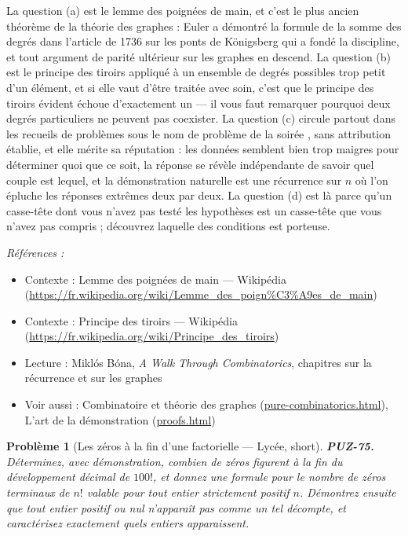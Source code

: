\documentclass[11pt]{article}
\newtheorem{problem}{Problème}
\newenvironment{refs}{\par\small\noindent\emph{Références :}\begin{itemize}\setlength\itemsep{0pt}}{\end{itemize}\normalsize}
\begin{document}
\noindent La question (a) est le lemme des poignées de main, et c'est le plus
ancien théorème de la théorie des graphes : Euler a démontré la formule de la somme des
degrés dans l'article de 1736 sur les ponts de Königsberg qui a fondé la discipline, et tout
argument de parité ultérieur sur les graphes en descend. La question (b) est le principe des
tiroirs appliqué à un ensemble de degrés possibles trop petit d'un élément, et si elle vaut
d'être traitée avec soin, c'est que le principe des tiroirs évident échoue d'exactement un ---
il vous faut remarquer pourquoi deux degrés particuliers ne peuvent pas coexister. La
question (c) circule partout dans les recueils de problèmes sous le nom de \og{} problème de la
soirée \fg{}, sans attribution établie, et elle mérite sa réputation : les données semblent bien
trop maigres pour déterminer quoi que ce soit, la réponse se révèle indépendante de savoir
quel couple est lequel, et la démonstration naturelle est une récurrence sur $ n $ où l'on
épluche les réponses extrêmes deux par deux. La question (d) est là parce qu'un casse-tête
dont vous n'avez pas testé les hypothèses est un casse-tête que vous n'avez pas compris ;
découvrez laquelle des conditions est porteuse.

\begin{refs}
\item Contexte : Lemme des poignées de main --- Wikipédia (\url{https://fr.wikipedia.org/wiki/Lemme_des_poign%C3%A9es_de_main})
\item Contexte : Principe des tiroirs --- Wikipédia (\url{https://fr.wikipedia.org/wiki/Principe_des_tiroirs})
\item Lecture : Miklós Bóna, \textit{A Walk Through Combinatorics}, chapitres sur la récurrence et sur les graphes
\item Voir aussi : Combinatoire et théorie des graphes (\url{pure-combinatorics.html}), L'art de la démonstration (\url{proofs.html})
\end{refs}

\bigskip

\begin{problem}[{Les zéros à la fin d'une factorielle --- Lycée, short}]
\textbf{PUZ-75.} Déterminez, avec démonstration, combien de zéros
figurent à la fin du développement décimal de $ 100! $, et donnez une formule pour le
nombre de zéros terminaux de $ n! $ valable pour tout entier strictement positif $ n $.
Démontrez ensuite que tout entier positif ou nul n'apparaît pas comme un tel décompte, et
caractérisez exactement quels entiers apparaissent.
\end{problem}
\end{document}

